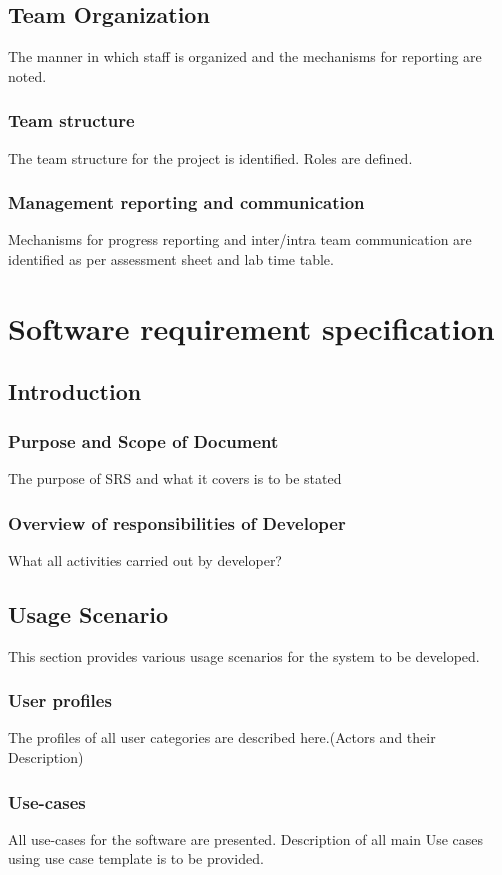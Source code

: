 \documentclass[oneside,a4paper,12pt]{report}
\begin{document}
 
\section{Team Organization}
The manner in which staff is organized and the mechanisms for reporting are noted.  
\subsection{Team structure}
The team structure for the project is identified. Roles are defined.

\subsection{Management reporting and communication}
Mechanisms for progress reporting and inter/intra team communication are identified as per assessment sheet and lab time table. 
 
\chapter{Software requirement specification }

\section{Introduction}
\subsection{Purpose and Scope of Document}
The purpose of SRS and what it covers is to be stated 

\subsection{Overview of responsibilities of Developer}
What all activities carried out by developer?
  
\section{Usage Scenario}
This section provides various usage scenarios for the system to be developed.  
 \subsection{User profiles}  
The profiles of all user categories are described here.(Actors and their Description)

\subsection{Use-cases}
All use-cases for the software are presented. Description of all main Use cases using use case template is to be provided.
\end{document}
